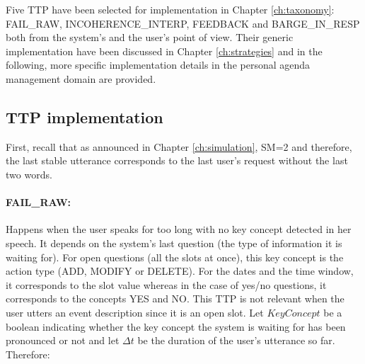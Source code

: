 		Five TTP have been selected for implementation in Chapter \ref{ch:taxonomy}:  FAIL\_RAW, INCOHERENCE\_INTERP, FEEDBACK and BARGE\_IN\_RESP both from the system's and the user's point of view. Their generic implementation have been discussed in Chapter \ref{ch:strategies} and in the following, more specific implementation details in the personal agenda management domain are provided.
    
    
	\subsection{TTP implementation}
    \label{subsec:ttpimpl}
    
    	First, recall that as announced in Chapter \ref{ch:simulation}, SM=2 and therefore, the last stable utterance corresponds to the last user's request without the last two words.
    
    	 \paragraph{FAIL\_RAW:} Happens when the user speaks for too long with no key concept detected in her speech. It depends on the system's last question (the type of information it is waiting for). For open questions (all the slots at once), this key concept is the action type (ADD, MODIFY or DELETE). For the dates and the time window, it corresponds to the slot value whereas in the case of yes/no questions, it corresponds to the concepts YES and NO. This TTP is not relevant when the user utters an event description since it is an open slot. Let $KeyConcept$ be a boolean indicating whether the key concept the system is waiting for has been pronounced or not and let $\Delta t$ be the duration of the user's utterance so far. Therefore:
			

